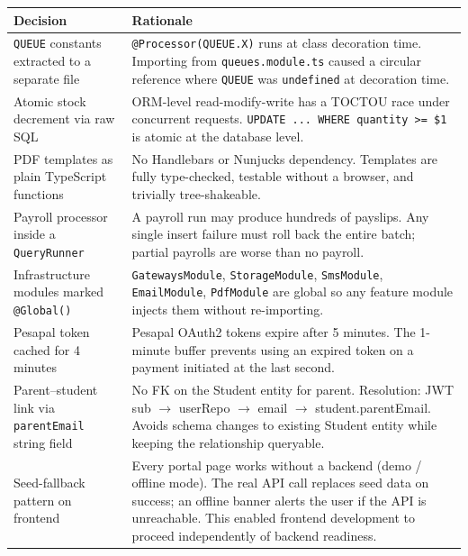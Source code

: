\documentclass[11pt, a4paper]{article}
\newcommand{\code}[1]{\texttt{\small #1}}
\begin{document}
\begin{tabular}{@{}p{4cm} p{10cm}@{}}
  \toprule
  Decision & Rationale \\
  \midrule
  \code{QUEUE} constants extracted to a separate file &
  \code{@Processor(QUEUE.X)} runs at class decoration time. Importing from
  \code{queues.module.ts} caused a circular reference where \code{QUEUE}
  was \code{undefined} at decoration time. \\
  \addlinespace[6pt]
  Atomic stock decrement via raw SQL &
  ORM-level read-modify-write has a TOCTOU race under concurrent requests.
  \code{UPDATE ... WHERE quantity >= \$1} is atomic at the database level. \\
  \addlinespace[6pt]
  PDF templates as plain TypeScript functions &
  No Handlebars or Nunjucks dependency. Templates are fully type-checked,
  testable without a browser, and trivially tree-shakeable. \\
  \addlinespace[6pt]
  Payroll processor inside a \code{QueryRunner} &
  A payroll run may produce hundreds of payslips. Any single insert failure
  must roll back the entire batch; partial payrolls are worse than no payroll. \\
  \addlinespace[6pt]
  Infrastructure modules marked \code{@Global()} &
  \code{GatewaysModule}, \code{StorageModule}, \code{SmsModule},
  \code{EmailModule}, \code{PdfModule} are global so any feature module
  injects them without re-importing. \\
  \addlinespace[6pt]
  Pesapal token cached for 4 minutes &
  Pesapal OAuth2 tokens expire after 5 minutes. The 1-minute buffer prevents
  using an expired token on a payment initiated at the last second. \\
  \addlinespace[6pt]
  Parent--student link via \code{parentEmail} string field &
  No FK on the Student entity for parent. Resolution: JWT sub $\to$ userRepo
  $\to$ email $\to$ student.parentEmail. Avoids schema changes to existing
  Student entity while keeping the relationship queryable. \\
  \addlinespace[6pt]
  Seed-fallback pattern on frontend &
  Every portal page works without a backend (demo / offline mode). The real
  API call replaces seed data on success; an offline banner alerts the user
  if the API is unreachable. This enabled frontend development to proceed
  independently of backend readiness. \\
  \bottomrule
\end{tabular}

\end{document}
